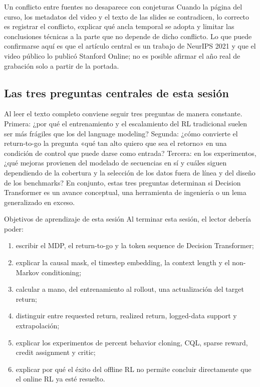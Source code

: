 \documentclass[a4paper]{article}
\begin{document}
\begin{warningbox}{Un conflicto entre fuentes no desaparece con conjeturas}
Cuando la página del curso, los metadatos del video y el texto de las slides se contradicen, lo correcto es registrar el conflicto, explicar qué ancla temporal se adopta y limitar las conclusiones técnicas a la parte que no depende de dicho conflicto. Lo que puede confirmarse aquí es que el artículo central es un trabajo de NeurIPS 2021 y que el video público lo publicó Stanford Online; no es posible afirmar el año real de grabación solo a partir de la portada.
\end{warningbox}

\subsection{Las tres preguntas centrales de esta sesión}

Al leer el texto completo conviene seguir tres preguntas de manera constante. Primera: ¿por qué el entrenamiento y el escalamiento del RL tradicional suelen ser más frágiles que los del language modeling? Segunda: ¿cómo convierte el return-to-go la pregunta «qué tan alto quiero que sea el retorno» en una condición de control que puede darse como entrada? Tercera: en los experimentos, ¿qué mejoras provienen del modelado de secuencias en sí y cuáles siguen dependiendo de la cobertura y la selección de los datos fuera de línea y del diseño de los benchmarks? En conjunto, estas tres preguntas determinan si Decision Transformer es un avance conceptual, una herramienta de ingeniería o un lema generalizado en exceso.

\begin{importantbox}{Objetivos de aprendizaje de esta sesión}
Al terminar esta sesión, el lector debería poder:
\begin{enumerate}
  \item escribir el MDP, el return-to-go y la token sequence de Decision Transformer;
  \item explicar la causal mask, el timestep embedding, la context length y el non-Markov conditioning;
  \item calcular a mano, del entrenamiento al rollout, una actualización del target return;
  \item distinguir entre requested return, realized return, logged-data support y extrapolación;
  \item explicar los experimentos de percent behavior cloning, CQL, sparse reward, credit assignment y critic;
  \item explicar por qué el éxito del offline RL no permite concluir directamente que el online RL ya esté resuelto.
\end{enumerate}
\end{importantbox}
\end{document}
